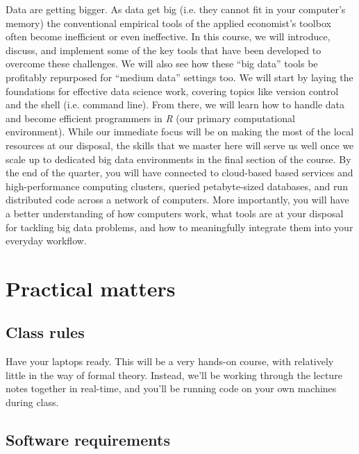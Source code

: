 \documentclass[12]{article}
\begin{document}
Data are getting bigger. As data get big (i.e. they cannot fit in your computer's memory) the conventional empirical tools of the applied economist's toolbox often become inefficient or even ineffective. %
In this course, we will introduce, discuss, and implement some of the key tools that have been developed to overcome these challenges. We will also see how these ``big data'' tools be profitably repurposed for ``medium data'' settings too.  We will start by laying the foundations for effective data science work, covering topics like version control and the shell (i.e. command line). From there, we will learn how to handle data and become efficient programmers in \textit{R} (our primary computational environment). While our immediate focus will be on making the most of the local resources at our disposal, the skills that we master here will serve us well once we scale up to dedicated big data environments in the final section of the course. By the end of the quarter, you will have connected to cloud-based based services and high-performance computing clusters, queried petabyte-sized databases, and run distributed code across a network of computers. More importantly, you will have a better understanding of how computers work, what tools are at your disposal for tackling big data problems, and how to meaningfully integrate them into your everyday workflow.

\newpage

\section*{Practical matters}

\subsection*{Class rules}

Have your laptops ready. This will be a very hands-on course, with relatively little in the way of formal theory. Instead, we'll be working through the lecture notes together in real-time, and you'll be running code on your own machines during class. 

\subsection*{Software requirements}
\end{document}
